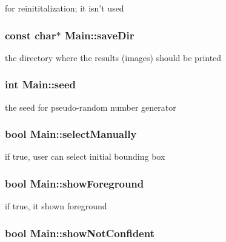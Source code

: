 for reinititalization; it isn't used 

\hypertarget{classMain_a4bc0c744bd9bb33aa9bbc92666819330}{
\subsubsection[{save\-Dir}]{\setlength{\rightskip}{0pt plus 5cm}const char$\ast$ Main\-::save\-Dir}}\label{classMain_a4bc0c744bd9bb33aa9bbc92666819330}


the directory where the results (images) should be printed 

\hypertarget{classMain_a886ff721bab62f931d37b4a0a7ce4b2d}{
\subsubsection[{seed}]{\setlength{\rightskip}{0pt plus 5cm}int Main\-::seed}}\label{classMain_a886ff721bab62f931d37b4a0a7ce4b2d}


the seed for pseudo-\/random number generator 

\hypertarget{classMain_a4fbe69e8eb79528ea332fb35bd4e2575}{
\subsubsection[{select\-Manually}]{\setlength{\rightskip}{0pt plus 5cm}bool Main\-::select\-Manually}}\label{classMain_a4fbe69e8eb79528ea332fb35bd4e2575}


if true, user can select initial bounding box 

\hypertarget{classMain_a9d083ec93a40eae468d5133fa7dc28ac}{
\subsubsection[{show\-Foreground}]{\setlength{\rightskip}{0pt plus 5cm}bool Main\-::show\-Foreground}}\label{classMain_a9d083ec93a40eae468d5133fa7dc28ac}


if true, it shown foreground 

\hypertarget{classMain_abeddae348e1825fbbe33d41457954aeb}{
\subsubsection[{show\-Not\-Confident}]{\setlength{\rightskip}{0pt plus 5cm}bool Main\-::show\-Not\-Confident}}\label{classMain_abeddae348e1825fbbe33d41457954aeb}


